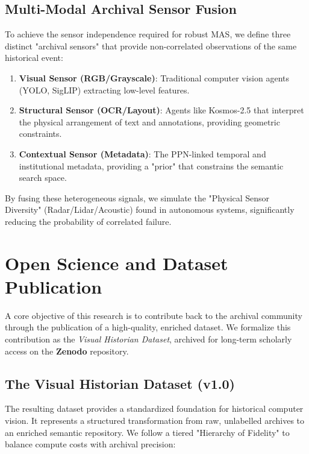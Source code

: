 \documentclass[12pt,onecolumn,a4paper]{IEEEtran}
\begin{document}
\subsection{Multi-Modal Archival Sensor Fusion}
To achieve the sensor independence required for robust MAS, we define three distinct "archival sensors" that provide non-correlated observations of the same historical event:
\begin{enumerate}
    \item \textbf{Visual Sensor (RGB/Grayscale)}: Traditional computer vision agents (YOLO, SigLIP) extracting low-level features.
    \item \textbf{Structural Sensor (OCR/Layout)}: Agents like Kosmos-2.5 that interpret the physical arrangement of text and annotations, providing geometric constraints.
    \item \textbf{Contextual Sensor (Metadata)}: The PPN-linked temporal and institutional metadata, providing a "prior" that constrains the semantic search space.
\end{enumerate}
By fusing these heterogeneous signals, we simulate the "Physical Sensor Diversity" (Radar/Lidar/Acoustic) found in autonomous systems, significantly reducing the probability of correlated failure.

\clearpage
\section{Open Science and Dataset Publication}
\label{sec:open_science}
A core objective of this research is to contribute back to the archival community through the publication of a high-quality, enriched dataset. We formalize this contribution as the \textit{Visual Historian Dataset}, archived for long-term scholarly access on the \textbf{Zenodo} repository.

\subsection{The Visual Historian Dataset (v1.0)}
The resulting dataset provides a standardized foundation for historical computer vision. It represents a structured transformation from raw, unlabelled archives to an enriched semantic repository. We follow a tiered "Hierarchy of Fidelity" to balance compute costs with archival precision:
\end{document}
